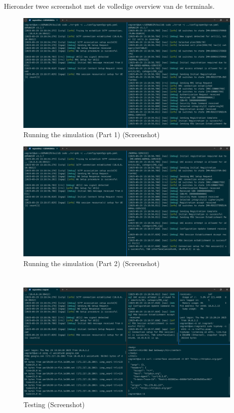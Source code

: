 Hieronder twee screenshot met de volledige overview van de terminals.

\begin{figure}[H]
    \includegraphics[width=\linewidth]{../graphics/POC-Run-1.png}
    \caption{Running the simulation (Part 1) (Screenshot)}
    \label{fig:runPart1}
\end{figure}
\begin{figure}[H]
    \includegraphics[width=\linewidth]{../graphics/POC-Run-2.png}
    \caption{Running the simulation (Part 2) (Screenshot)}
    \label{fig:runPart2}
\end{figure}

\section{}%
\label{sec:Test}%

\begin{figure}[H]
    \includegraphics[width=\linewidth]{../graphics/POC-test.png}
    \caption{Testing (Screenshot)}
    \label{fig:Test-Overview}
\end{figure}

